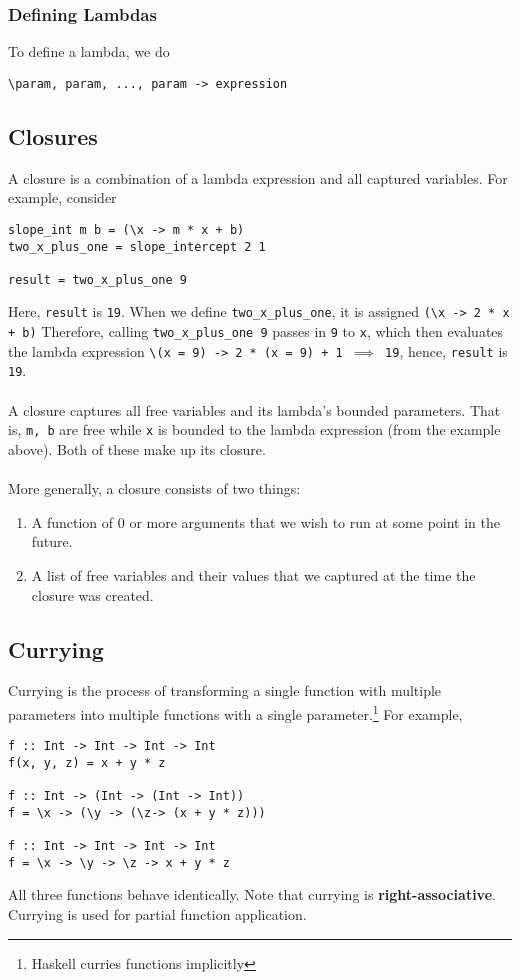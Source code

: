 \documentclass{article}
\begin{document}
\subsubsection{Defining Lambdas}
To define a lambda, we do
\begin{verbatim}
\param, param, ..., param -> expression
\end{verbatim}

\subsection{Closures}
A closure is a combination of a lambda expression and all captured
variables. For example, consider
\begin{verbatim}
slope_int m b = (\x -> m * x + b)
two_x_plus_one = slope_intercept 2 1

result = two_x_plus_one 9
\end{verbatim}
Here, \texttt{result} is \texttt{19}. When we define
\texttt{two\_x\_plus\_one}, it is assigned \texttt{(\textbackslash x
  -> 2 * x + b)} Therefore, calling \texttt{two\_x\_plus\_one 9}
passes in \texttt{9} to \texttt{x}, which then evaluates the lambda
expression \texttt{\textbackslash (x = 9) -> 2 * (x = 9) + 1 $\implies$ 19}, hence,
\texttt{result} is \texttt{19}. \\ \\
A closure captures all free variables and its lambda's bounded 
parameters. That is, \texttt{m, b} are free while \texttt{x} is
bounded to the lambda expression (from the example above). Both of
these make up its closure. \\ \\
More generally, a closure consists of two things:
\begin{enumerate}[label=(\roman*),align=left]
\item A function of 0 or more arguments that we wish to run at some
  point in the future.
\item A list of free variables and their values that we captured at
  the time the closure was created.
\end{enumerate}





\subsection{Currying}
Currying is the process of transforming a single function with
multiple parameters into multiple functions with a single
parameter.\footnote{Haskell curries functions implicitly} For example,
\begin{verbatim}
f :: Int -> Int -> Int -> Int
f(x, y, z) = x + y * z

f :: Int -> (Int -> (Int -> Int))
f = \x -> (\y -> (\z-> (x + y * z)))

f :: Int -> Int -> Int -> Int
f = \x -> \y -> \z -> x + y * z
\end{verbatim}
All three functions behave identically. Note that currying is
\textbf{right-associative}. Currying is used for partial function
application.
\end{document}
